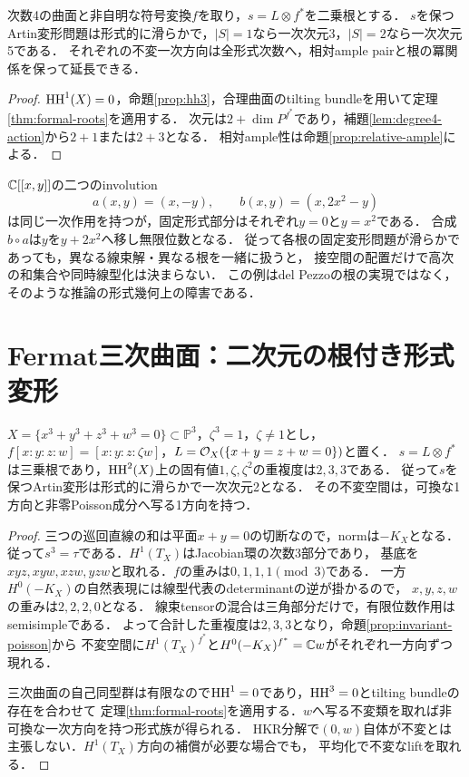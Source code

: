 \begin{corollary}[各符号根の全次数持上げ]\label{cor:degree4-formal}
次数4の曲面と非自明な符号変換$f$を取り，$s=L\otimes f^*$を二乗根とする．
$s$を保つArtin変形問題は形式的に滑らかで，$|S|=1$なら一次次元3，$|S|=2$なら一次次元5である．
それぞれの不変一次方向は全形式次数へ，相対ample pairと根の冪関係を保って延長できる．
\end{corollary}
\begin{proof}
$\operatorname{HH}^1(X)=0$，命題\ref{prop:hh3}，合理曲面のtilting bundleを用いて定理\ref{thm:formal-roots}を適用する．
次元は$2+\dim P^{f^*}$であり，補題\ref{lem:degree4-action}から$2+1$または$2+3$となる．
相対ample性は命題\ref{prop:relative-ample}による．
\end{proof}

\begin{example}[同じ接空間から同じ固定形式部分は従わない]\label{ex:nonlinear-fixed}
$\mathbb C[[x,y]]$の二つのinvolution
\[
 a(x,y)=(x,-y),\qquad b(x,y)=(x,2x^2-y)
\]
は同じ一次作用を持つが，固定形式部分はそれぞれ$y=0$と$y=x^2$である．
合成$b\circ a$は$y$を$y+2x^2$へ移し無限位数となる．
従って各根の固定変形問題が滑らかであっても，異なる線束解・異なる根を一緒に扱うと，
接空間の配置だけで高次の和集合や同時線型化は決まらない．
この例はdel Pezzoの根の実現ではなく，そのような推論の形式幾何上の障害である．
\end{example}

\section{Fermat三次曲面：二次元の根付き形式変形}
\label{sec:fermat}
\begin{proposition}\label{prop:fermat-formal}
$X=\{x^3+y^3+z^3+w^3=0\}\subset\mathbb P^3$，$\zeta^3=1$，$\zeta\ne1$とし，
$f[x:y:z:w]=[x:y:z:\zeta w]$，$L=\mathcal O_X(\{x+y=z+w=0\})$と置く．
$s=L\otimes f^*$は三乗根であり，$\operatorname{HH}^2(X)$上の固有値$1,\zeta,\zeta^2$の重複度は$2,3,3$である．
従って$s$を保つArtin変形は形式的に滑らかで一次次元2となる．
その不変空間は，可換な1方向と非零Poisson成分へ写る1方向を持つ．
\end{proposition}
\begin{proof}
三つの巡回直線の和は平面$x+y=0$の切断なので，normは$-K_X$となる．
従って$s^3=\tau$である．$H^1(T_X)$はJacobian環の次数3部分であり，
基底を$xyz,xyw,xzw,yzw$と取れる．$f$の重みは$0,1,1,1\pmod3$である．
一方$H^0(-K_X)$の自然表現には線型代表のdeterminantの逆が掛かるので，
$x,y,z,w$の重みは$2,2,2,0$となる．
線束tensorの混合は三角部分だけで，有限位数作用はsemisimpleである．
よって合計した重複度は$2,3,3$となり，命題\ref{prop:invariant-poisson}から
不変空間に$H^1(T_X)^{f^*}$と$H^0(-K_X)^{f^*}=\mathbb C w$がそれぞれ一方向ずつ現れる．

三次曲面の自己同型群は有限なので$\operatorname{HH}^1=0$であり，$\operatorname{HH}^3=0$とtilting bundleの存在を合わせて
定理\ref{thm:formal-roots}を適用する．$w$へ写る不変類を取れば非可換な一次方向を持つ形式族が得られる．
HKR分解で$(0,w)$自体が不変とは主張しない．$H^1(T_X)$方向の補償が必要な場合でも，
平均化で不変なliftを取れる．
\end{proof}

